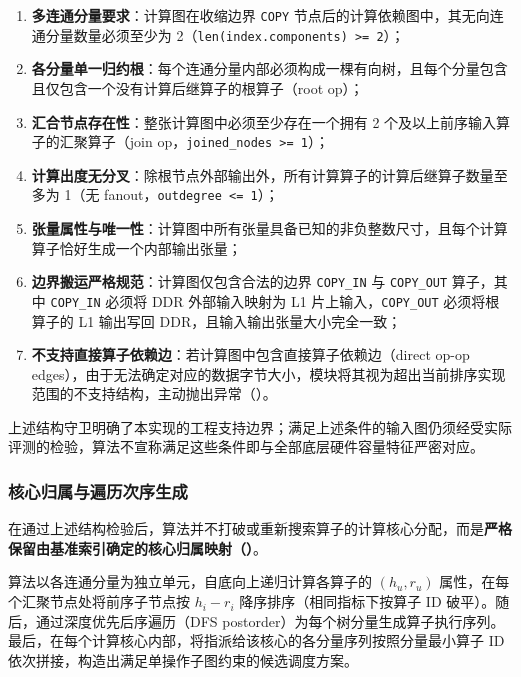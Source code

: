 \documentclass[anonymous,withtoc]{gmcm2026}
\providecommand{\tightlist}{\setlength{\itemsep}{0pt}\setlength{\parskip}{0pt}}
\begin{document}
\begin{enumerate}
\def\labelenumi{\arabic{enumi}.}
\tightlist
\item
  \textbf{多连通分量要求}：计算图在收缩边界 \texttt{COPY} 节点后的计算依赖图中，其无向连通分量数量必须至少为 2（\texttt{len(index.components)\ \textgreater{}=\ 2}）；
\item
  \textbf{各分量单一归约根}：每个连通分量内部必须构成一棵有向树，且每个分量包含且仅包含一个没有计算后继算子的根算子（root op）；
\item
  \textbf{汇合节点存在性}：整张计算图中必须至少存在一个拥有 2 个及以上前序输入算子的汇聚算子（join op，\texttt{joined\_nodes\ \textgreater{}=\ 1}）；
\item
  \textbf{计算出度无分叉}：除根节点外部输出外，所有计算算子的计算后继算子数量至多为 1（无 fanout，\texttt{outdegree\ \textless{}=\ 1}）；
\item
  \textbf{张量属性与唯一性}：计算图中所有张量具备已知的非负整数尺寸，且每个计算算子恰好生成一个内部输出张量；
\item
  \textbf{边界搬运严格规范}：计算图仅包含合法的边界 \texttt{COPY\_IN} 与 \texttt{COPY\_OUT} 算子，其中 \texttt{COPY\_IN} 必须将 DDR 外部输入映射为 L1 片上输入，\texttt{COPY\_OUT} 必须将根算子的 L1 输出写回 DDR，且输入输出张量大小完全一致；
\item
  \textbf{不支持直接算子依赖边}：若计算图中包含直接算子依赖边（direct op-op edges），由于无法确定对应的数据字节大小，模块将其视为超出当前排序实现范围的不支持结构，主动抛出异常（\texttt{}）。
\end{enumerate}

上述结构守卫明确了本实现的工程支持边界；满足上述条件的输入图仍须经受实际评测的检验，算法不宣称满足这些条件即与全部底层硬件容量特征严密对应。

\subsubsection{核心归属与遍历次序生成}

在通过上述结构检验后，算法并不打破或重新搜索算子的计算核心分配，而是\textbf{严格保留由基准索引确定的核心归属映射（\texttt{}）}。

算法以各连通分量为独立单元，自底向上递归计算各算子的 \((h_u, r_u)\) 属性，在每个汇聚节点处将前序子节点按 \(h_i - r_i\) 降序排序（相同指标下按算子 ID 破平）。随后，通过深度优先后序遍历（DFS postorder）为每个树分量生成算子执行序列。最后，在每个计算核心内部，将指派给该核心的各分量序列按照分量最小算子 ID 依次拼接，构造出满足单操作子图约束的候选调度方案。
\end{document}
